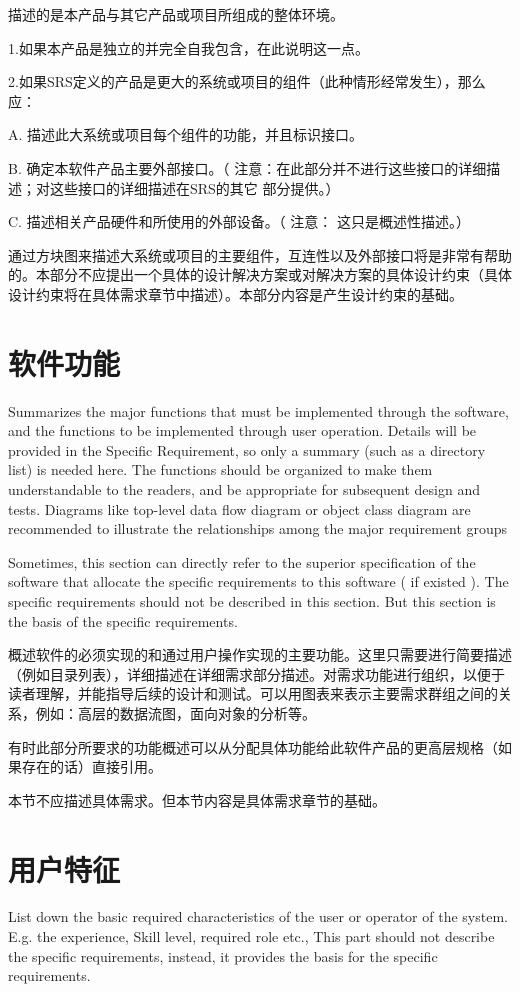 描述的是本产品与其它产品或项目所组成的整体环境。

1.如果本产品是独立的并完全自我包含，在此说明这一点。

2.如果SRS定义的产品是更大的系统或项目的组件（此种情形经常发生），那么应：

	A. 描述此大系统或项目每个组件的功能，并且标识接口。

	B.  确定本软件产品主要外部接口。（ 注意：在此部分并不进行这些接口的详细描述；对这些接口的详细描述在SRS的其它 部分提供。）
    
    C. 描述相关产品硬件和所使用的外部设备。（  注意：  这只是概述性描述。）

通过方块图来描述大系统或项目的主要组件，互连性以及外部接口将是非常有帮助的。本部分不应提出一个具体的设计解决方案或对解决方案的具体设计约束（具体设计约束将在具体需求章节中描述）。本部分内容是产生设计约束的基础。

\section{软件功能}
Summarizes the major functions that must be implemented through the software, and the functions to be implemented through user operation. Details will be provided in the Specific Requirement, so only a summary (such as a directory list) is needed here. The functions should be organized to make them understandable to the readers, and be appropriate for subsequent design and tests. Diagrams like top-level data flow diagram or object class diagram are recommended to illustrate the relationships among the major requirement groups 

Sometimes, this section can directly refer to the superior specification of the software that allocate the specific requirements to this software ( if existed ).
The specific requirements should not be described in this section. But this section is the basis of the specific requirements.

概述软件的必须实现的和通过用户操作实现的主要功能。这里只需要进行简要描述（例如目录列表），详细描述在详细需求部分描述。对需求功能进行组织，以便于读者理解，并能指导后续的设计和测试。可以用图表来表示主要需求群组之间的关系，例如：高层的数据流图，面向对象的分析等。

有时此部分所要求的功能概述可以从分配具体功能给此软件产品的更高层规格（如果存在的话）直接引用。

本节不应描述具体需求。但本节内容是具体需求章节的基础。

\section{用户特征}
List down the basic required characteristics of the user or operator of the system. E.g. the experience, Skill level, required role etc., 
This part should not describe the specific requirements, instead, it provides the basis for the specific requirements.

